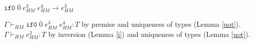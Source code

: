 \begin{case}
$\mathtt{if0}\;\overline{0}\;e_{HM}^{3}\;e_{HM}^{4}\rightarrow e_{HM}^{3}$

$\Gamma\vdash_{HM}\mathtt{if0}\;\overline{0}\;e_{HM}^{3}\;e_{HM}^{4}:T$ by premise and uniqueness of types (Lemma \ref{uot}).  $\Gamma\vdash_{HM}e_{HM}^{3}:T$ by inversion (Lemma \ref{i}) and uniqueness of types (Lemma \ref{uot}).
\end{case}